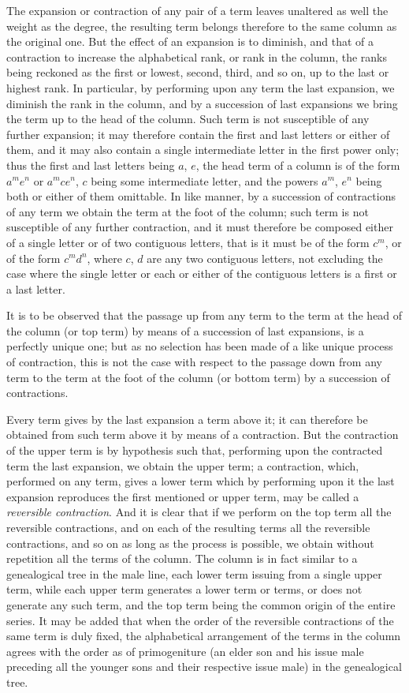 \documentclass[11pt,a4paper]{book}
\begin{document}
The expansion or contraction of any pair of a term leaves unaltered as well the weight as the degree, the resulting term belongs therefore to the same column as the original one. But the effect of an expansion is to diminish, and that of a contraction to increase the alphabetical rank, or rank in the column, the ranks being reckoned as the first or lowest, second, third, and so on, up to the last or highest rank. In particular, by performing upon any term the last expansion, we diminish the rank in the column, and by a succession of last expansions we bring the term up to the head of the column. Such term is not susceptible of any further expansion; it may therefore contain the first and last letters or either of them, and it may also contain a single intermediate letter in the first power only; thus the first and last letters being $a$, $e$, the head term of a column is of the form $a^me^n$ or $a^mce^n$, $c$ being some intermediate letter, and the powers $a^m$, $e^n$ being both or either of them omittable. In like manner, by a succession of contractions of any term we obtain the term at the foot of the column; such term is not susceptible of any further contraction, and it must therefore be composed either of a single letter or of two contiguous letters, that is it must be of the form $c^m$, or of the form $c^md^n$, where $c$, $d$ are any two contiguous letters, not excluding the case where the single letter or each or either of the contiguous letters is a first or a last letter.

It is to be observed that the passage up from any term to the term at the head of the column (or top term) by means of a succession of last expansions, is a perfectly unique one; but as no selection has been made of a like unique process of contraction, this is not the case with respect to the passage down from any term to the term at the foot of the column (or bottom term) by a succession of contractions.

Every term gives by the last expansion a term above it; it can therefore be obtained from such term above it by means of a contraction. But the contraction of the upper term is by hypothesis such that, performing upon the contracted term the last expansion, we obtain the upper term; a contraction, which, performed on any term, gives a lower term which by performing upon it the last expansion reproduces the first mentioned or upper term, may be called a \textit{reversible contraction}. And it is clear that if we perform on the top term all the reversible contractions, and on each of the resulting terms all the reversible contractions, and so on as long as the process is possible, we obtain without repetition all the terms of the column. The column is in fact similar to a genealogical tree in the male line, each lower term issuing from a single upper term, while each upper term generates a lower term or terms, or does not generate any such term, and the top term being the common origin of the entire series. It may be added that when the order of the reversible contractions of the same term is duly fixed, the alphabetical arrangement of the terms in the column agrees with the order as of primogeniture (an elder son and his issue male preceding all the younger sons and their respective issue male) in the genealogical tree.
\end{document}
